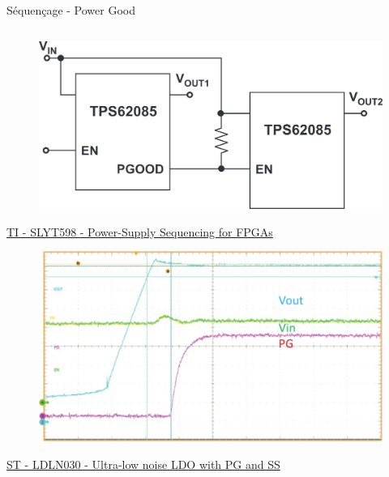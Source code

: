 \begin{frame}{Séquençage - Power Good}
\begin{columns}
        \begin{column}{0.6\textwidth}
            \centering
            \footnotesize
            \vspace{-8pt}
            \begin{figure}
                \includegraphics[width=\textwidth, height=0.33\textheight, keepaspectratio]{pictures/power-good-sequence.png}
            \end{figure}
            \vspace{-8pt}
            \href{https://www.ti.com/lit/an/slyt598/slyt598.pdf}{TI - SLYT598 - Power-Supply Sequencing for FPGAs}
            \vfill
            \begin{figure}
                \includegraphics[width=\textwidth, height=0.33\textheight, keepaspectratio]{pictures/power-good.png}
            \end{figure}
            \vspace{-8pt}
            \href{https://www.latticesemi.com/view_document?document_id=49312}{ST - LDLN030 - Ultra-low noise LDO with PG and SS}
        \end{column}
    \end{columns}
\end{frame}

